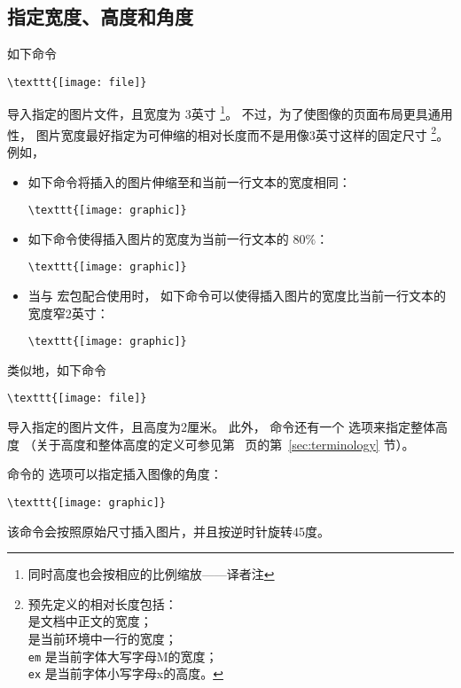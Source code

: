 \subsection{指定宽度、高度和角度}\label{ssec:spec-width-height-angle}
如下命令
\begin{lstlisting}
\texttt{[image: file]}
\end{lstlisting}
导入指定的图片文件，且宽度为 3英寸
\footnote{同时高度也会按相应的比例缩放——译者注}。
不过，为了使图像的页面布局更具通用性，
图片宽度最好指定为可伸缩的相对长度而不是用像3英寸这样的固定尺寸
\footnote{
	预先定义的相对长度包括：\\
	 是文档中正文的宽度；\\
	 是当前环境中一行的宽度；\\
	\texttt{em} 是当前字体大写字母M的宽度；\\
	\texttt{ex} 是当前字体小写字母x的高度。}。
例如，
\begin{itemize}
	\item 如下命令将插入的图片伸缩至和当前一行文本的宽度相同：
\begin{lstlisting}
\texttt{[image: graphic]}
\end{lstlisting}
	\item 如下命令使得插入图片的宽度为当前一行文本的 $80\percent$：
\begin{lstlisting}
\texttt{[image: graphic]}
\end{lstlisting}
	\item 当与  宏包配合使用时，
	如下命令可以使得插入图片的宽度比当前一行文本的宽度窄2英寸：
\begin{lstlisting}
\texttt{[image: graphic]}
\end{lstlisting}
	
\end{itemize}

类似地，如下命令
\begin{lstlisting}
\texttt{[image: file]}
\end{lstlisting}
导入指定的图片文件，且高度为2厘米。
此外， 命令还有一个  选项来指定整体高度
（关于高度和整体高度的定义可参见第~\pageref{sec:terminology} 页的第~\ref{sec:terminology} 节）。

 命令的  选项可以指定插入图像的角度：
\begin{lstlisting}
\texttt{[image: graphic]}
\end{lstlisting}
该命令会按照原始尺寸插入图片，并且按逆时针旋转45度。

